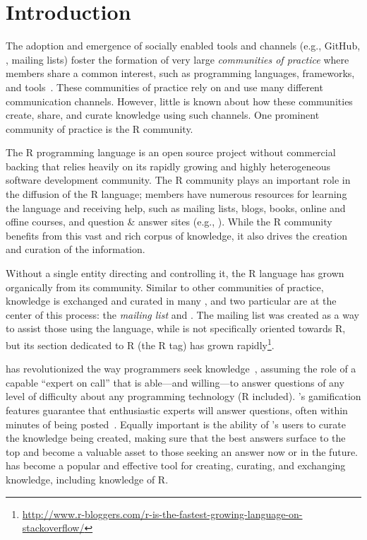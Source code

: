 \section{Introduction}
\label{cha:introduction}
The adoption and emergence of socially enabled tools and channels (e.g., GitHub, \SO, mailing lists) foster the formation of very large \textit{communities of practice} where members share a common interest, such as programming languages, frameworks, and tools~\cite{Storey2014}. These communities of practice rely on and use many different communication channels. However, little is known about how these communities create, share, and curate knowledge using such channels. One prominent community of practice is the R community.

The R programming language is an open source project without commercial backing that relies heavily on its rapidly growing and highly heterogeneous software development community. The R community plays an important role in the diffusion of the R language; members have numerous resources for learning the language and receiving help, such as mailing lists, blogs, books, online and offine courses, and question \& answer sites (e.g., \SO). While the R community benefits from this vast and rich corpus of knowledge, it also drives the creation and curation of the information.

Without a single entity directing and controlling it, the R language has grown organically from its community. Similar to other communities of practice, knowledge is exchanged and curated in many \channels, and two particular \channels are at the center of this process: the \textit{\RH mailing list} and \textit{\SO}. The \RH mailing list was created as a way to assist those using the language, while \SO is not specifically oriented towards R, but its section dedicated to R (the R tag) has grown rapidly\footnote{\href{http://www.r-bloggers.com/r-is-the-fastest-growing-language-on-stackoverflow/}{http://www.r-bloggers.com/r-is-the-fastest-growing-language-on-stackoverflow/}}.

\SO has revolutionized the way programmers seek knowledge~\cite{li2013help,Vasilescu2014c}, assuming the role of a capable ``expert on call'' that is able---and willing---to answer questions of any level of difficulty about any programming technology (R included). \SO's gamification features guarantee that enthusiastic experts will answer questions, often within minutes of being posted~\cite{Mamykina2011}. Equally important is the ability of \SO's users to curate the knowledge being created, making sure that the best answers surface to the top and become a valuable asset to those seeking an answer now or in the future. \SO has become a popular and effective tool for creating, curating, and exchanging knowledge, including knowledge of R.

